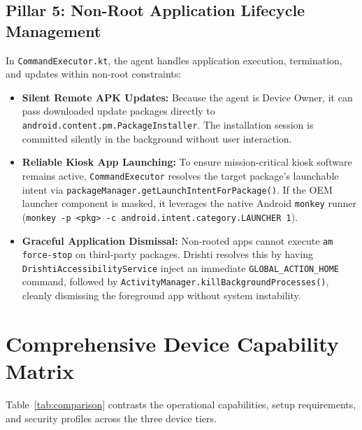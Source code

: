 \documentclass[11pt,a4paper]{article}
\begin{document}
\subsection{Pillar 5: Non-Root Application Lifecycle Management}
In \texttt{CommandExecutor.kt}, the agent handles application execution, termination, and updates within non-root constraints:
\begin{itemize}[leftmargin=*]
    \item \textbf{Silent Remote APK Updates:} Because the agent is Device Owner, it can pass downloaded update packages directly to \texttt{android.content.pm.PackageInstaller}. The installation session is committed silently in the background without user interaction.
    \item \textbf{Reliable Kiosk App Launching:} To ensure mission-critical kiosk software remains active, \texttt{CommandExecutor} resolves the target package's launchable intent via \texttt{packageManager.getLaunchIntentForPackage()}. If the OEM launcher component is masked, it leverages the native Android \texttt{monkey} runner (\texttt{monkey -p <pkg> -c android.intent.category.LAUNCHER 1}).
    \item \textbf{Graceful Application Dismissal:} Non-rooted apps cannot execute \texttt{am force-stop} on third-party packages. Drishti resolves this by having \texttt{DrishtiAccessibilityService} inject an immediate \texttt{GLOBAL\_ACTION\_HOME} command, followed by \texttt{ActivityManager.killBackgroundProcesses()}, cleanly dismissing the foreground app without system instability.
\end{itemize}

\section{Comprehensive Device Capability Matrix}

Table~\ref{tab:comparison} contrasts the operational capabilities, setup requirements, and security profiles across the three device tiers.
\end{document}
